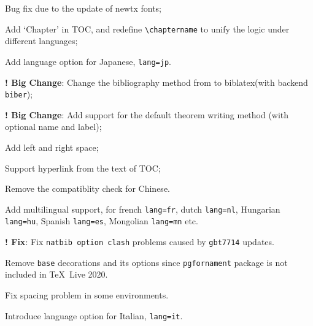 \documentclass[11pt]{elegantbook}
\begin{document}

\begin{change}
  \item Bug fix due to the update of newtx fonts;
  \item Add `Chapter' in TOC, and redefine \lstinline{\chaptername} to unify the logic under different languages;
  \item Add language option for Japanese, \lstinline{lang=jp}.
\end{change}



\begin{change}
  \item \textbf{! Big Change}: Change the bibliography method from  to biblatex(with backend  \lstinline{biber});
  \item \textbf{! Big Change}: Add support for the default theorem writing method (with optional name and label);
  \item Add left and right space;
  \item Support hyperlink from the text of TOC;
  \item Remove the  compatiblity check for Chinese.
  \item Add multilingual support, for french \lstinline{lang=fr}, dutch \lstinline{lang=nl}, Hungarian  \lstinline{lang=hu}, Spanish \lstinline{lang=es}, Mongolian \lstinline{lang=mn} etc.
\end{change}



\begin{change}
  \item \textbf{! Fix}: Fix \lstinline{natbib option clash} problems caused by \lstinline{gbt7714} updates.
  \item Remove \lstinline{base} decorations and its options since \lstinline{pgfornament} package is not included in \TeX~Live 2020.
  \item Fix spacing problem in some environments.
  \item Introduce language option for Italian, \lstinline{lang=it}.
\end{change}


\end{document}
